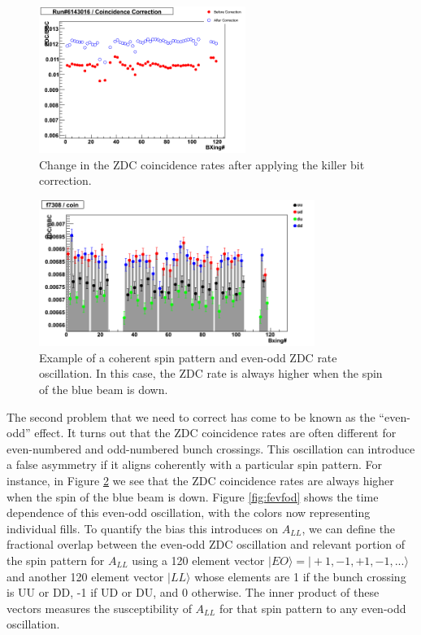 \begin{figure}
  \begin{center}
    \includegraphics[width=0.6\textwidth]{figures/coinRat6143016}
  \end{center}
  \caption{Change in the ZDC coincidence rates after applying the killer bit correction.}
  \label{fig:coinRat6143016}
\end{figure}

\begin{figure}
  \begin{center}
    \includegraphics[width=0.8\textwidth]{figures/c7308}
  \end{center}
  \caption{Example of a coherent spin pattern and even-odd ZDC rate oscillation.  In this case, the ZDC rate is always higher when the spin of the blue beam is down.}
  \label{fig:c7308}
\end{figure}

The second problem that we need to correct has come to be known as the ``even-odd'' effect.  It turns out that the ZDC coincidence rates are often different for even-numbered and odd-numbered bunch crossings.  This oscillation can introduce a false asymmetry if it aligns coherently with a particular spin pattern.  For instance, in Figure \ref{fig:c7308} we see that the ZDC coincidence rates are always higher when the spin of the blue beam is down.  Figure \ref{fig:fevfod} shows the time dependence of this even-odd oscillation, with the colors now representing individual fills.  To quantify the bias this introduces on $A_{LL}$, we can define the fractional overlap between the even-odd ZDC oscillation and relevant portion of the spin pattern for $A_{LL}$ using a 120 element vector $|EO\rangle = |+1,-1,+1,-1,...\rangle$ and another 120 element vector $|LL\rangle$ whose elements are 1 if the bunch crossing is UU or DD, -1 if UD or DU, and 0 otherwise.  The inner product of these vectors measures the susceptibility of $A_{LL}$ for that spin pattern to any even-odd oscillation.


